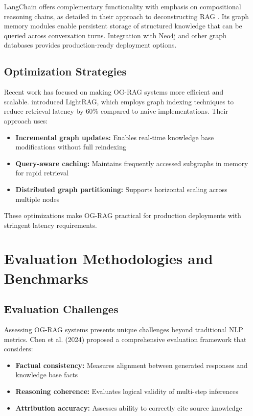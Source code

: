 \documentclass[12pt]{report}
\begin{document}
LangChain offers complementary functionality with emphasis on compositional reasoning chains, as detailed in their approach to deconstructing RAG \citep{DeconstructingRAG2023}. Its graph memory modules enable persistent storage of structured knowledge that can be queried across conversation turns. Integration with Neo4j and other graph databases provides production-ready deployment options.

\subsection{Optimization Strategies}

Recent work has focused on making OG-RAG systems more efficient and scalable. \citet{guo2024lightrag} introduced LightRAG, which employs graph indexing techniques to reduce retrieval latency by 60\% compared to naive implementations. Their approach uses:
\begin{itemize}
\item \textbf{Incremental graph updates:} Enables real-time knowledge base modifications without full reindexing
\item \textbf{Query-aware caching:} Maintains frequently accessed subgraphs in memory for rapid retrieval
\item \textbf{Distributed graph partitioning:} Supports horizontal scaling across multiple nodes
\end{itemize}

These optimizations make OG-RAG practical for production deployments with stringent latency requirements.

\section{Evaluation Methodologies and Benchmarks}

\subsection{Evaluation Challenges}

Assessing OG-RAG systems presents unique challenges beyond traditional NLP metrics. Chen et al. (2024) proposed a comprehensive evaluation framework that considers:
\begin{itemize}
\item \textbf{Factual consistency:} Measures alignment between generated responses and knowledge base facts
\item \textbf{Reasoning coherence:} Evaluates logical validity of multi-step inferences
\item \textbf{Attribution accuracy:} Assesses ability to correctly cite source knowledge
\end{itemize}
\end{document}
